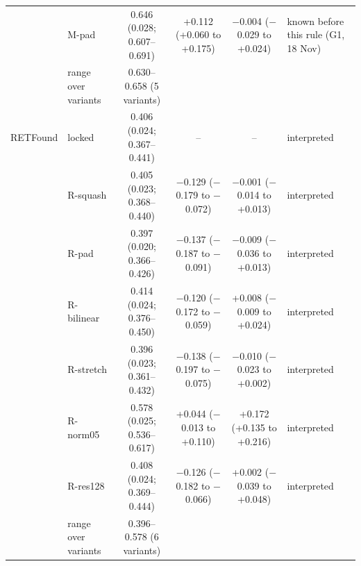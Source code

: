 \begin{longtable}{@{}llcccp{3.6cm}@{}}
 & M-pad & \makecell{0.646\\{\scriptsize (0.028; 0.607--0.691)}} & \makecell{+0.112\\{\scriptsize (+0.060 to +0.175)}} & \makecell{$-$0.004\\{\scriptsize ($-$0.029 to +0.024)}} & known before this rule (G1, 18 Nov) \\
 & range over variants & 0.630--0.658 (5 variants) &  &  &  \\
\addlinespace[2pt]
RETFound & locked & \makecell{0.406\\{\scriptsize (0.024; 0.367--0.441)}} & -- & -- & interpreted \\
 & R-squash & \makecell{0.405\\{\scriptsize (0.023; 0.368--0.440)}} & \makecell{$-$0.129\\{\scriptsize ($-$0.179 to $-$0.072)}} & \makecell{$-$0.001\\{\scriptsize ($-$0.014 to +0.013)}} & interpreted \\
 & R-pad & \makecell{0.397\\{\scriptsize (0.020; 0.366--0.426)}} & \makecell{$-$0.137\\{\scriptsize ($-$0.187 to $-$0.091)}} & \makecell{$-$0.009\\{\scriptsize ($-$0.036 to +0.013)}} & interpreted \\
 & R-bilinear & \makecell{0.414\\{\scriptsize (0.024; 0.376--0.450)}} & \makecell{$-$0.120\\{\scriptsize ($-$0.172 to $-$0.059)}} & \makecell{+0.008\\{\scriptsize ($-$0.009 to +0.024)}} & interpreted \\
 & R-stretch & \makecell{0.396\\{\scriptsize (0.023; 0.361--0.432)}} & \makecell{$-$0.138\\{\scriptsize ($-$0.197 to $-$0.075)}} & \makecell{$-$0.010\\{\scriptsize ($-$0.023 to +0.002)}} & interpreted \\
 & R-norm05 & \makecell{0.578\\{\scriptsize (0.025; 0.536--0.617)}} & \makecell{+0.044\\{\scriptsize ($-$0.013 to +0.110)}} & \makecell{+0.172\\{\scriptsize (+0.135 to +0.216)}} & interpreted \\
 & R-res128 & \makecell{0.408\\{\scriptsize (0.024; 0.369--0.444)}} & \makecell{$-$0.126\\{\scriptsize ($-$0.182 to $-$0.066)}} & \makecell{+0.002\\{\scriptsize ($-$0.039 to +0.048)}} & interpreted \\
 & range over variants & 0.396--0.578 (6 variants) &  &  &  \\
\end{longtable}
